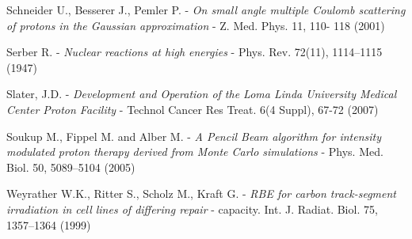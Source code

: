 \documentclass[12pt, a4paper, twoside]{book}
\begin{document}
\begin{thebibliography}{99}
Schneider U., Besserer J., Pemler P. - 
\emph{On small angle multiple Coulomb scattering of protons in the Gaussian approximation} - 
Z. Med. Phys. 11,  110- 118 (2001)

Serber R. - 
\emph{Nuclear reactions at high energies} -
Phys. Rev. 72(11), 1114–1115 (1947)

Slater, J.D. -
\emph{Development and Operation of the Loma Linda University Medical Center Proton Facility} -
Technol Cancer Res Treat. 6(4 Suppl), 67-72 (2007)

Soukup M., Fippel M. and Alber M. -
\emph{A Pencil Beam algorithm for intensity modulated proton therapy derived from Monte Carlo simulations} -
Phys. Med. Biol. 50, 5089–5104 (2005)


Weyrather W.K., Ritter S., Scholz M., Kraft G. - 
\emph{RBE for carbon track-segment irradiation in cell lines of differing repair} -
capacity. Int. J. Radiat. Biol. 75, 1357–1364 (1999)




\end{thebibliography}




\end{document}
